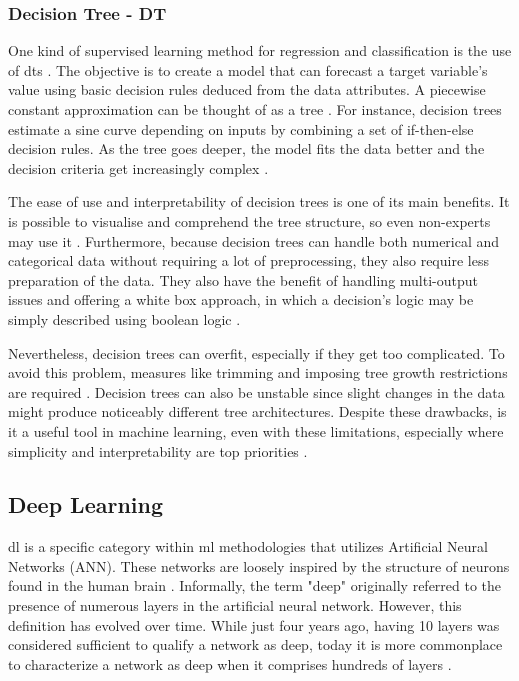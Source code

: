 \subsubsection{Decision Tree - DT}

One kind of supervised learning method for regression and classification is the use of \acfp{dt} \citep{sklearn_dtt}. The objective is to create a model that can forecast a target variable's value using basic decision rules deduced from the data attributes. A piecewise constant approximation can be thought of as a tree \citep{sklearn_dtt}. For instance, decision trees estimate a sine curve depending on inputs by combining a set of if-then-else decision rules. As the tree goes deeper, the model fits the data better and the decision criteria get increasingly complex \citep{sklearn_dtt}.

The ease of use and interpretability of decision trees is one of its main benefits. It is possible to visualise and comprehend the tree structure, so even non-experts may use it \citep{sklearn_dtt}. Furthermore, because decision trees can handle both numerical and categorical data without requiring a lot of preprocessing, they also require less preparation of the data. They also have the benefit of handling multi-output issues and offering a white box approach, in which a decision's logic may be simply described using boolean logic \citep{sklearn_dtt}.

Nevertheless, decision trees can overfit, especially if they get too complicated. To avoid this problem, measures like trimming and imposing tree growth restrictions are required \citep{sklearn_dtt}. Decision trees can also be unstable since slight changes in the data might produce noticeably different tree architectures. Despite these drawbacks, is it a useful tool in machine learning, even with these limitations, especially where simplicity and interpretability are top priorities \citep{sklearn_dtt}.


\subsection{Deep Learning}
\ac{dl} is a specific category within \ac{ml} methodologies that utilizes Artificial Neural Networks (ANN). These networks are loosely inspired by the structure of neurons found in the human brain \citep{gulli_deep_2017}. Informally, the term "deep" originally referred to the presence of numerous layers in the artificial neural network. However, this definition has evolved over time. While just four years ago, having 10 layers was considered sufficient to qualify a network as deep, today it is more commonplace to characterize a network as deep when it comprises hundreds of layers \citep{gulli_deep_2017}. 

